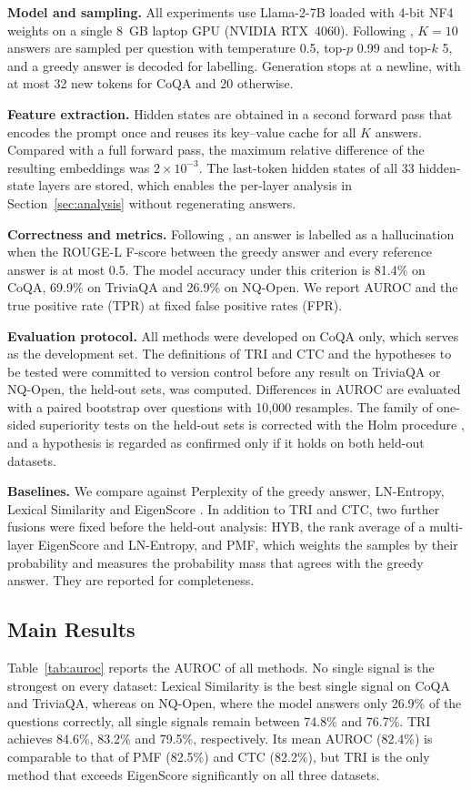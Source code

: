 \documentclass[10pt]{article}
\begin{document}
\textbf{Model and sampling.} All experiments use Llama-2-7B \citep{touvron2023llama} loaded with 4-bit NF4 weights \citep{dettmers2023qlora} on a single 8~GB laptop GPU (NVIDIA RTX~4060). Following \citet{chen2024inside}, $K=10$ answers are sampled per question with temperature 0.5, top-$p$ 0.99 and top-$k$ 5, and a greedy answer is decoded for labelling. Generation stops at a newline, with at most 32 new tokens for CoQA and 20 otherwise.

\textbf{Feature extraction.} Hidden states are obtained in a second forward pass that encodes the prompt once and reuses its key--value cache for all $K$ answers. Compared with a full forward pass, the maximum relative difference of the resulting embeddings was $2\times10^{-3}$. The last-token hidden states of all 33 hidden-state layers are stored, which enables the per-layer analysis in Section~\ref{sec:analysis} without regenerating answers.

\textbf{Correctness and metrics.} Following \citet{chen2024inside}, an answer is labelled as a hallucination when the ROUGE-L F-score between the greedy answer and every reference answer is at most 0.5. The model accuracy under this criterion is 81.4\% on CoQA, 69.9\% on TriviaQA and 26.9\% on NQ-Open. We report AUROC and the true positive rate (TPR) at fixed false positive rates (FPR).

\textbf{Evaluation protocol.} All methods were developed on CoQA only, which serves as the development set. The definitions of TRI and CTC and the hypotheses to be tested were committed to version control before any result on TriviaQA or NQ-Open, the held-out sets, was computed. Differences in AUROC are evaluated with a paired bootstrap over questions with 10,000 resamples. The family of one-sided superiority tests on the held-out sets is corrected with the Holm procedure \citep{holm1979}, and a hypothesis is regarded as confirmed only if it holds on both held-out datasets.

\textbf{Baselines.} We compare against Perplexity of the greedy answer, LN-Entropy, Lexical Similarity and EigenScore \citep{chen2024inside}. In addition to TRI and CTC, two further fusions were fixed before the held-out analysis: HYB, the rank average of a multi-layer EigenScore and LN-Entropy, and PMF, which weights the samples by their probability and measures the probability mass that agrees with the greedy answer. They are reported for completeness.

\subsection{Main Results}
Table~\ref{tab:auroc} reports the AUROC of all methods. No single signal is the strongest on every dataset: Lexical Similarity is the best single signal on CoQA and TriviaQA, whereas on NQ-Open, where the model answers only 26.9\% of the questions correctly, all single signals remain between 74.8\% and 76.7\%. TRI achieves 84.6\%, 83.2\% and 79.5\%, respectively. Its mean AUROC (82.4\%) is comparable to that of PMF (82.5\%) and CTC (82.2\%), but TRI is the only method that exceeds EigenScore significantly on all three datasets.
\end{document}
